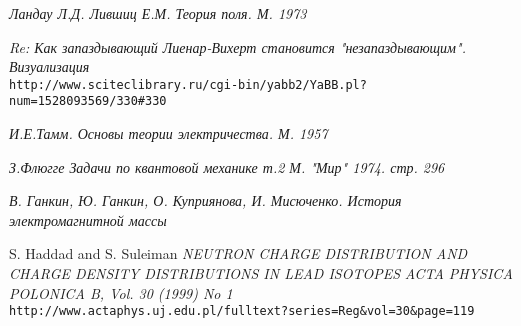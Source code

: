 \documentclass{article}
\begin{document}
\begin{thebibliography}{99}

\textit{Ландау Л.Д. Лившиц Е.М. Теория поля. М. 1973}

\textit{Re: Как запаздывающий Лиенар-Вихерт становится "незапаздывающим". Визуализация}
\\\texttt{http://www.sciteclibrary.ru/cgi-bin/yabb2/YaBB.pl?num=1528093569/330\#330}

\textit{И.Е.Тамм. Основы теории электричества. М. 1957}

\textit{З.Флюгге Задачи по квантовой механике т.2 М. "Мир" 1974. стр. 296}

\textit{В. Ганкин, Ю. Ганкин, О. Куприянова, И. Мисюченко. История электромагнитной массы}


S. Haddad and S. Suleiman
\textit{NEUTRON CHARGE DISTRIBUTION AND CHARGE DENSITY DISTRIBUTIONS IN LEAD ISOTOPES}
\textit{ACTA PHYSICA POLONICA B, Vol. 30 (1999) No 1}
\\\texttt{http://www.actaphys.uj.edu.pl/fulltext?series=Reg\&vol=30\&page=119}



\end{thebibliography}
\end{document}
